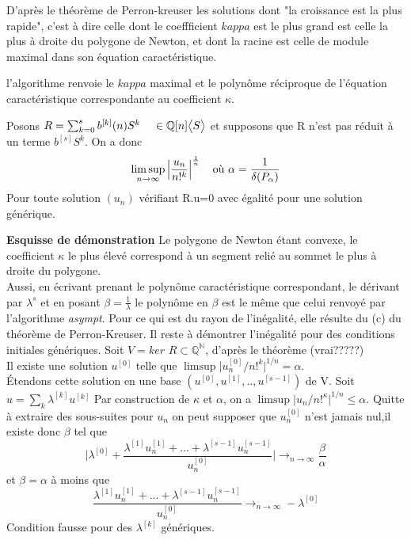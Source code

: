 \documentclass[a4paper,10.5pt]{article}
\begin{document}
	\noindent D'après le théorème de Perron-kreuser les solutions dont "la croissance est la plus rapide", c'est à dire celle dont le coeffficient $kappa$ est le plus grand est celle la plus à droite du polygone de Newton, et dont la racine est celle de module maximal dans son équation caractéristique.
	
	l'algorithme renvoie le $kappa$ maximal et le polynôme réciproque de l'équation caractéristique correspondante au coefficient $\kappa$.
	
	\begin{proposition} Posons $R=\sum_{k=0}^{s} b^{[k]}(n)S^{k} \hspace{4mm} \in \mathbb{Q}[n]\big<S\big>$ et supposons que R n'est pas réduit à un terme $b^{[s]}S^{k}$. On a donc
		\[\limsup_{n \rightarrow \infty }\Big|\frac{u_{n}}{n!^{k}}\Big|^{\frac{1}{n}} \hspace{4mm} \text{où } \alpha=\frac{1}{\delta(P_{\alpha})}\]
		Pour toute solution $(u_{n})$ vérifiant R.u=0 avec égalité pour une solution générique. 
	\end{proposition}
	\textbf{Esquisse de démonstration}
	Le polygone de Newton étant convexe, le coefficient $\kappa$ le plus élevé correspond à un segment relié au sommet le plus à droite du polygone.\\
	Aussi, en écrivant prenant le polynôme caractéristique correspondant, le dérivant par $\lambda^{s}$ et en posant $\beta=\frac{1}{\lambda}$ le polynôme en $\beta$ est le même que celui renvoyé par l'algorithme \textit{asympt}. Pour ce qui est du rayon de l'inégalité, elle résulte du (c) du théorème de Perron-Kreuser.
	Il reste à démontrer l'inégalité pour des conditions initiales génériques. Soit $V=ker$ $R \subset \mathbb{Q}^{\mathbb{N}}$, d'après le théorème (vrai?????)\\
	Il existe une solution $u^{[0]}$ telle que $\limsup \big|u^{[0]}_{n}/n!^{k}\big|^{1/n}=\alpha$.\\
	Étendons cette solution en une base $(u^{[0]},u^{[1]},..,u^{[s-1]})$ de V. Soit $u=\sum_{k}\lambda^{[k]}u^{[k]}$
	Par construction de $\kappa$ et $\alpha$, on a $\limsup \big|u_{n}/n!^{\kappa}\big|^{1/n} \leq \alpha$. Quitte à extraire des sous-suites pour $u_{n}$ on peut supposer que $u^{[0]}_{n}$ n'est jamais nul,il existe donc $\beta$ tel que
	\[\Big|\lambda^{[0]}+\frac{\lambda^{[1]}u^{[1]}_{n}+...+\lambda^{[s-1]}u^{[s-1]}_{n}}{u^{[0]}_{n}}\Big| \rightarrow_{n \rightarrow \infty} \frac{\beta}{\alpha}\] 
	et $\beta=\alpha$ à moins que 
	\[\frac{\lambda^{[1]}u^{[1]}_{n}+...+\lambda^{[s-1]}u^{[s-1]}_{n}}{u^{[0]}_{n}}\rightarrow_{n \rightarrow \infty}-\lambda^{[0]}\]
	Condition fausse pour des $\lambda^{[k]}$ génériques.
	
\end{document}
